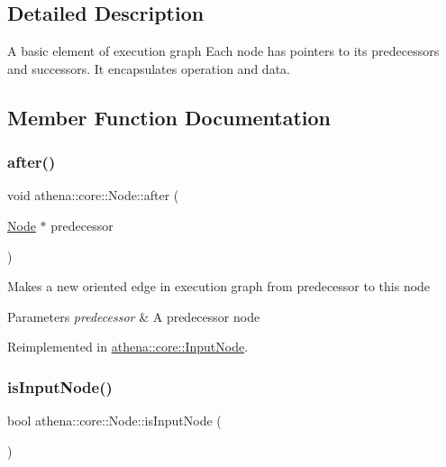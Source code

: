 \subsection{Detailed Description}
A basic element of execution graph Each node has pointers to its predecessors and successors. It encapsulates operation and data. 

\subsection{Member Function Documentation}
\mbox{\label{classathena_1_1core_1_1_node_aefef588463c8e215e998415a7cc6b320}} 
\subsubsection{\texorpdfstring{after()}{after()}}
{\footnotesize\ttfamily void athena\+::core\+::\+Node\+::after (\begin{DoxyParamCaption}\item[{\mbox{\hyperlink{classathena_1_1core_1_1_node}{Node}} $\ast$}]{predecessor }\end{DoxyParamCaption})\hspace{0.3cm}{\ttfamily [virtual]}}

Makes a new oriented edge in execution graph from predecessor to this node 
\begin{DoxyParams}{Parameters}
{\em predecessor} & A predecessor node \\
\hline
\end{DoxyParams}


Reimplemented in \mbox{\hyperlink{classathena_1_1core_1_1_input_node_aaec12f4c76b6d9890efe1fb4337a1b61}{athena\+::core\+::\+Input\+Node}}.

\mbox{\label{classathena_1_1core_1_1_node_a6ae012557fc6b29127366b1e92801d4a}} 
\subsubsection{\texorpdfstring{is\+Input\+Node()}{isInputNode()}}
{\footnotesize\ttfamily bool athena\+::core\+::\+Node\+::is\+Input\+Node (\begin{DoxyParamCaption}{ }\end{DoxyParamCaption})\hspace{0.3cm}{\ttfamily [virtual]}}

